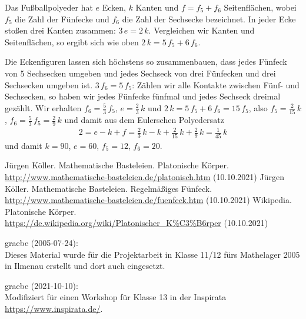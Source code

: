 \documentclass[11pt]{article}
\begin{document}
Das Fußballpolyeder hat $e$ Ecken, $k$ Kanten und $f=f_5+f_6$ Seitenflächen,
wobei $f_5$ die Zahl der Fünfecke und $f_6$ die Zahl der Sechsecke bezeichnet.
In jeder Ecke stoßen drei Kanten zusammen: $3\,e=2\,k$.  Vergleichen wir
Kanten und Seitenflächen, so ergibt sich wie oben $2\,k=5\,f_5+6\,f_6$.

Die Eckenfiguren lassen sich höchstens so zusammenbauen, dass jedes Fünfeck
von 5 Sechsecken umgeben und jedes Sechseck von drei Fünfecken und drei
Sechsecken umgeben ist.  $3\,f_6=5\,f_5$: Zählen wir alle Kontakte zwischen
Fünf- und Sechsecken, so haben wir jedes Fünfecke fünfmal und jedes Sechseck
dreimal gezählt.  Wir erhalten $f_6=\frac53\,f_5$, $e=\frac23\,k$ und
$2\,k=5\,f_5+6\,f_6=15\,f_5$, also $f_5=\frac{2}{15}\,k$,
$f_6=\frac53\,f_5=\frac{2}{9}\,k$ und damit aus dem Eulerschen Polyedersatz
\begin{gather*}
  2=e-k+f=\frac23\,k-k+\frac{2}{15}\,k+\frac{2}{9}\,k=\frac{1}{45}\,k
\end{gather*}
und damit $k=90$, $e=60$, $f_5=12$, $f_6=20$. 


\begin{thebibliography}{xxx}
 Jürgen Köller. Mathematische Basteleien.
  Platonische Körper.\\
  \url{http://www.mathematische-basteleien.de/platonisch.htm} (10.10.2021)
 Jürgen Köller. Mathematische Basteleien.
  Regelmäßiges Fünfeck.\\
  \url{http://www.mathematische-basteleien.de/fuenfeck.htm} (10.10.2021)
 Wikipedia. Platonische Körper.\\ 
  \url{https://de.wikipedia.org/wiki/Platonischer_K%C3%B6rper} (10.10.2021)
\end{thebibliography}

\begin{attribution}
graebe (2005-07-24):\\ Dieses Material wurde für die Projektarbeit in Klasse
11/12 fürs Mathelager 2005 in Ilmenau erstellt und dort auch eingesetzt.

graebe (2021-10-10):\\ Modifiziert für einen Workshop für Klasse 13 in der
Inspirata \url{https://www.inspirata.de/}.

\end{attribution}
\end{document}
